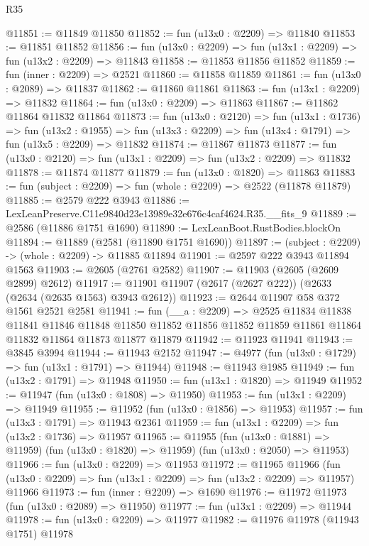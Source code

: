 \begin{lexlean}{R35}
\begin{coremodule}
@11851 := @11849 @11850
@11852 := fun (u13x0 : @2209) => @11840
@11853 := @11851 @11852
@11856 := fun (u13x0 : @2209) => fun (u13x1 : @2209) => fun (u13x2 : @2209) => @11843
@11858 := @11853 @11856 @11852
@11859 := fun (inner : @2209) => @2521
@11860 := @11858 @11859
@11861 := fun (u13x0 : @2089) => @11837
@11862 := @11860 @11861
@11863 := fun (u13x1 : @2209) => @11832
@11864 := fun (u13x0 : @2209) => @11863
@11867 := @11862 @11864 @11832 @11864
@11873 := fun (u13x0 : @2120) =>
  fun (u13x1 : @1736) =>
  fun (u13x2 : @1955) => fun (u13x3 : @2209) => fun (u13x4 : @1791) => fun (u13x5 : @2209) => @11832
@11874 := @11867 @11873
@11877 := fun (u13x0 : @2120) => fun (u13x1 : @2209) => fun (u13x2 : @2209) => @11832
@11878 := @11874 @11877
@11879 := fun (u13x0 : @1820) => @11863
@11883 := fun (subject : @2209) => fun (whole : @2209) => @2522 (@11878 @11879)
@11885 := @2579 @222 @3943
@11886 := LexLeanPreserve.C11e9840d23e13989e32e676c4caf4624.R35.__fits_9
@11889 := @2586 (@11886 @1751 @1690)
@11890 := LexLeanBoot.RustBodies.blockOn
@11894 := @11889 (@2581 (@11890 @1751 @1690))
@11897 := (subject : @2209) -> (whole : @2209) -> @11885 @11894
@11901 := @2597 @222 @3943 @11894 @1563
@11903 := @2605 (@2761 @2582)
@11907 := @11903 (@2605 (@2609 @2899) @2612)
@11917 := @11901 @11907 (@2617 (@2627 @222)) (@2633 (@2634 (@2635 @1563) @3943 @2612))
@11923 := @2644 @11907 @58 @372 @1561 @2521 @2581
@11941 := fun (__a : @2209) =>
  @2525
    @11834
    @11838
    @11841
    @11846
    @11848
    @11850
    @11852
    @11856
    @11852
    @11859
    @11861
    @11864
    @11832
    @11864
    @11873
    @11877
    @11879
@11942 := @11923 @11941
@11943 := @3845 @3994
@11944 := @11943 @2152
@11947 := @4977 (fun (u13x0 : @1729) => fun (u13x1 : @1791) => @11944)
@11948 := @11943 @1985
@11949 := fun (u13x2 : @1791) => @11948
@11950 := fun (u13x1 : @1820) => @11949
@11952 := @11947 (fun (u13x0 : @1808) => @11950)
@11953 := fun (u13x1 : @2209) => @11949
@11955 := @11952 (fun (u13x0 : @1856) => @11953)
@11957 := fun (u13x3 : @1791) => @11943 @2361
@11959 := fun (u13x1 : @2209) => fun (u13x2 : @1736) => @11957
@11965 := @11955
    (fun (u13x0 : @1881) => @11959)
    (fun (u13x0 : @1820) => @11959)
    (fun (u13x0 : @2050) => @11953)
@11966 := fun (u13x0 : @2209) => @11953
@11972 := @11965
    @11966
    (fun (u13x0 : @2209) => fun (u13x1 : @2209) => fun (u13x2 : @2209) => @11957)
    @11966
@11973 := fun (inner : @2209) => @1690
@11976 := @11972 @11973 (fun (u13x0 : @2089) => @11950)
@11977 := fun (u13x1 : @2209) => @11944
@11978 := fun (u13x0 : @2209) => @11977
@11982 := @11976 @11978 (@11943 @1751) @11978

\end{coremodule}
\end{lexlean}
